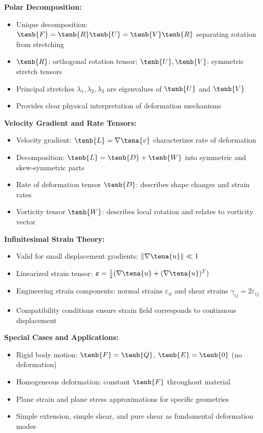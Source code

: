 \begin{subox}[Summary]
\textbf{Polar Decomposition:}
\begin{itemize}
\item Unique decomposition: $\tenb{F} = \tenb{R} \tenb{U} = \tenb{V} \tenb{R}$ separating rotation from stretching
\item $\tenb{R}$: orthogonal rotation tensor; $\tenb{U}, \tenb{V}$: symmetric stretch tensors
\item Principal stretches $\lambda_1, \lambda_2, \lambda_3$ are eigenvalues of $\tenb{U}$ and $\tenb{V}$
\item Provides clear physical interpretation of deformation mechanisms
\end{itemize}

\textbf{Velocity Gradient and Rate Tensors:}
\begin{itemize}
\item Velocity gradient: $\tenb{L} = \nabla \tena{v}$ characterizes rate of deformation
\item Decomposition: $\tenb{L} = \tenb{D} + \tenb{W}$ into symmetric and skew-symmetric parts
\item Rate of deformation tensor $\tenb{D}$: describes shape changes and strain rates
\item Vorticity tensor $\tenb{W}$: describes local rotation and relates to vorticity vector
\end{itemize}

\textbf{Infinitesimal Strain Theory:}
\begin{itemize}
\item Valid for small displacement gradients: $\|\nabla \tena{u}\| \ll 1$
\item Linearized strain tensor: $\boldsymbol{\varepsilon} = \frac{1}{2}(\nabla \tena{u} + (\nabla \tena{u})^T)$
\item Engineering strain components: normal strains $\varepsilon_{ii}$ and shear strains $\gamma_{ij} = 2\varepsilon_{ij}$
\item Compatibility conditions ensure strain field corresponds to continuous displacement
\end{itemize}

\textbf{Special Cases and Applications:}
\begin{itemize}
\item Rigid body motion: $\tenb{F} = \tenb{Q}$, $\tenb{E} = \tenb{0}$ (no deformation)
\item Homogeneous deformation: constant $\tenb{F}$ throughout material
\item Plane strain and plane stress approximations for specific geometries
\item Simple extension, simple shear, and pure shear as fundamental deformation modes
\end{itemize}


\end{subox}
